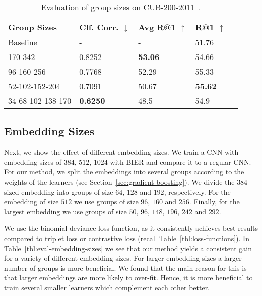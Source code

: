 \documentclass[10pt,journal,compsoc]{IEEEtran}
\begin{document}
\begin{table}[htbp]
    \caption{Evaluation of group sizes on CUB-200-2011~\cite{WahCUB_200_2011}.}
    \label{tbl:group-sizes}
    \renewcommand{\arraystretch}{1.3}
    \centering
        \begin{tabular}{lllll}
            \hline

            \hline
            Group Sizes       &  Clf. Corr. $\downarrow$      & Avg R@1 $\uparrow$       &  R@1 $\uparrow$ \\
            \hline
            Baseline          & -                & -              & 51.76 \\
            \hline
            170-342           &   0.8252         & \textbf{53.06} & 54.66  \\
            96-160-256        &  0.7768          & 52.29          & 55.33 \\
            52-102-152-204    &  0.7091          & 50.67          & \textbf{55.62} \\
            34-68-102-138-170 &  \textbf{0.6250} & 48.5           & 54.9  \\
            \hline

        \end{tabular}
\end{table}\subsection{Embedding Sizes}\label{sec:eval-embedding-size}

Next, we show the effect of different embedding sizes. We train a CNN with embedding sizes of $384$, $512$, $1024$ with \ac{BIER}
and compare it to a regular \ac{CNN}. For our method, we split the embeddings into several groups according to the weights of the learners (see Section~\ref{sec:gradient-boosting}). 
We divide the $384$ sized embedding into groups  of size $64$, $128$ and $192$, respectively. For the embedding of size $512$ we 
use groups of size $96$, $160$ and $256$. Finally, for the largest embedding we use groups of 
size $50$, $96$, $148$, $196$, $242$ and $292$.

We use the binomial deviance loss function, as it consistently achieves best
results compared to triplet loss or contrastive loss (recall
Table~\ref{tbl:loss-functions}). In Table~\ref{tbl:eval-embedding-sizes} we see
that our method yields a consistent gain for a variety of different embedding sizes. For larger embedding 
sizes a larger number of groups is more beneficial. 
We found that the main reason for this is that larger embeddings are more likely to over-fit. 
Hence, it is more beneficial to train several smaller learners which complement each other better.
\end{document}
